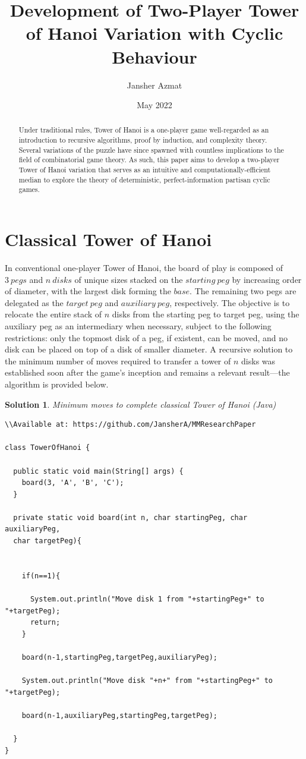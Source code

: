 \documentclass[12pt,reqno]{amsart}
\title{Development of Two-Player Tower of Hanoi Variation with Cyclic Behaviour}
\author{Jansher Azmat}
\date{May 2022}
\theoremstyle{plain}
\newtheorem*{solution}{Solution}
\begin{document}
\begin{abstract}
Under traditional rules, Tower of Hanoi is a one-player game well-regarded as an introduction to recursive algorithms, proof by induction, and complexity theory. Several variations of the puzzle have since spawned with countless implications to the field of combinatorial game theory. As such, this paper aims to develop a two-player Tower of Hanoi variation that serves as an intuitive and computationally-efficient median to explore the theory of deterministic, perfect-information partisan cyclic games.
\end{abstract}

\maketitle

\section{Classical Tower of Hanoi}
In conventional one-player Tower of Hanoi, the board of play is composed of $3 \ pegs$ and $n \ disks$ of unique sizes stacked on the $starting \ peg$ by increasing order of diameter, with the largest disk forming the $base$. The remaining two pegs are delegated as the $target \ peg$ and $auxiliary \ peg$, respectively. The objective is to relocate the entire stack of $n$ disks from the starting peg to target peg, using the auxiliary peg as an intermediary when necessary, subject to the following restrictions: only the topmost disk of a peg, if existent, can be moved, and no disk can be placed on top of a disk of smaller diameter. A recursive solution to the minimum number of moves required to transfer a tower of $n$ disks was established soon after the game’s inception and remains a relevant result—the algorithm is provided below.
\begin{solution}
Minimum moves to complete classical Tower of Hanoi (Java)
\break
\begin{verbatim}
\\Available at: https://github.com/JansherA/MMResearchPaper

class TowerOfHanoi {
 
  public static void main(String[] args) {
    board(3, 'A', 'B', 'C');
  }
 
  private static void board(int n, char startingPeg, char auxiliaryPeg, 
  char targetPeg){
 
 
    if(n==1){
    
      System.out.println("Move disk 1 from "+startingPeg+" to "+targetPeg);
      return;
    }
 
    board(n-1,startingPeg,targetPeg,auxiliaryPeg);
 
    System.out.println("Move disk "+n+" from "+startingPeg+" to "+targetPeg);
 
    board(n-1,auxiliaryPeg,startingPeg,targetPeg);
    
  }
}

\end{verbatim}
\end{solution}
\end{document}
